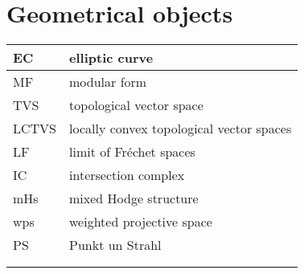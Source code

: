 \documentclass{amsart}
\numberwithin{equation}{section}
\theoremstyle{plain}
\numberwithin{equation}{section}
\theoremstyle{remark}
\begin{document}
\section{Geometrical objects}
\begin{longtable}{l|l}
\hline
EC & elliptic curve \\ \hline
MF & modular form  \\ \hline
TVS & topological vector space\\ \hline
LCTVS &  locally convex topological vector spaces\\ \hline
LF & limit of Fréchet spaces\\ \hline
IC & intersection complex\\ \hline
mHs & mixed Hodge structure\\ \hline
wps & weighted projective space\\ \hline
PS & Punkt un Strahl\\ \hline
 & \\ \hline
 & \\ \hline
\end{longtable}
\end{document}
